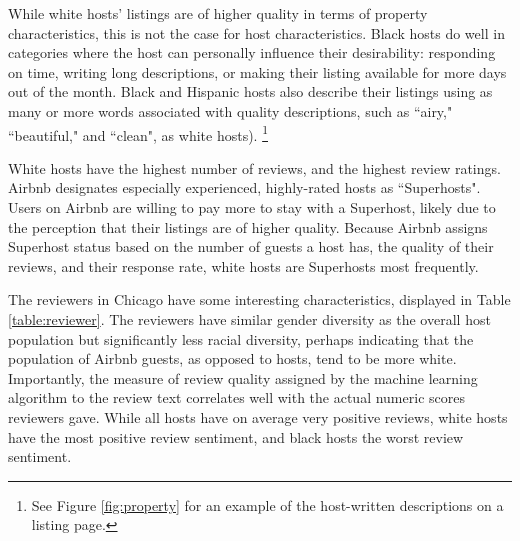 While white hosts' listings are of higher quality in terms of property characteristics, this is not the case for host characteristics. Black hosts do well in categories where the host can personally influence their desirability: responding on time, writing long descriptions, or making their listing available for more days out of the month. %
Black and Hispanic hosts also describe their listings using as many or more words associated with quality descriptions, such as ``airy," ``beautiful," and ``clean", as white hosts).%
\footnote{See Figure \ref{fig:property} for an example of the host-written descriptions on a listing page.} 


White hosts have the highest number of reviews, and the highest review ratings. Airbnb designates especially experienced, highly-rated hosts as ``Superhosts". Users on Airbnb are willing to pay more to stay with a Superhost, likely due to the perception that their listings are of higher quality. Because Airbnb assigns Superhost status based on the number of guests a host has, the quality of their reviews, and their response rate, white hosts are Superhosts most frequently. %

The reviewers in Chicago have some interesting characteristics, displayed in Table \ref{table:reviewer}. The reviewers have similar gender diversity as the overall host population but significantly less racial diversity, perhaps indicating that the population of Airbnb guests, as opposed to hosts, tend to be  more white. Importantly, the measure of review quality assigned by the machine learning algorithm to the review text correlates  well with the actual numeric scores reviewers gave. While all hosts have on average very positive reviews, white hosts have the most positive review sentiment, and black hosts the worst review sentiment.





